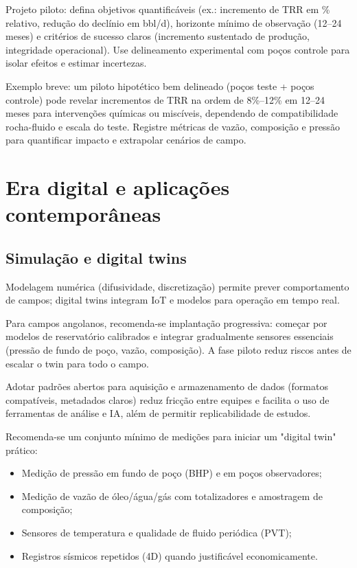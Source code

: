 \documentclass[
  12pt,
  a4paper,
  oneside,
  brazilian,
  sumario=tradicional
]{abntex2}
\begin{document}
Projeto piloto: defina objetivos quantificáveis (ex.: incremento de TRR em  \% relativo, redução do declínio em bbl/d), horizonte mínimo de observação (12--24 meses) e critérios de sucesso claros (incremento sustentado de produção, integridade operacional). Use delineamento experimental com poços controle para isolar efeitos e estimar incertezas.

Exemplo breve: um piloto hipotético bem delineado (poços teste + poços controle) pode revelar incrementos de TRR na ordem de 8\%--12\% em 12--24 meses para intervenções químicas ou miscíveis, dependendo de compatibilidade rocha-fluido e escala do teste. Registre métricas de vazão, composição e pressão para quantificar impacto e extrapolar cenários de campo.

\chapter{Era digital e aplicações contemporâneas}
\section{Simulação e digital twins}
Modelagem numérica (difusividade, discretização) permite prever comportamento
de campos; digital twins integram IoT e modelos para operação em tempo real.

Para campos angolanos, recomenda-se implantação progressiva: começar por
modelos de reservatório calibrados e integrar gradualmente sensores essenciais
(pressão de fundo de poço, vazão, composição). A fase piloto reduz riscos antes
de escalar o twin para todo o campo.

Adotar padrões abertos para aquisição e armazenamento de dados (formatos
compatíveis, metadados claros) reduz fricção entre equipes e facilita o uso
de ferramentas de análise e IA, além de permitir replicabilidade de estudos.

Recomenda-se um conjunto mínimo de medições para iniciar um "digital twin" prático:
\begin{itemize}
  \item Medição de pressão em fundo de poço (BHP) e em poços observadores;
  \item Medição de vazão de óleo/água/gás com totalizadores e amostragem de composição;
  \item Sensores de temperatura e qualidade de fluido periódica (PVT);
  \item Registros sísmicos repetidos (4D) quando justificável economicamente.
\end{itemize}
\end{document}
